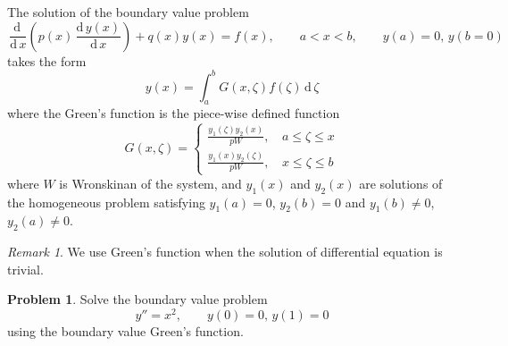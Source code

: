 \documentclass[12pt,a4paper]{article}
\theoremstyle{remark}
\newtheorem* {rem}{Remark}
\theoremstyle{definition}
\newtheorem{prob}{Problem}[section]
\newcommand{\ddx}[1]{\,\frac{\mathrm{d}\,#1}{\mathrm{d}\,x}}
\newcommand{\D}{\,\mathrm{d}\,}
\begin{document}
The solution of the boundary value problem
\[
    \ddx{}\left( p(x)\ddx{y(x)} \right)+q(x)y(x)=f(x),\qquad a<x<b,\qquad y(a)=0,\,y(b=0)
\]
takes the form
\[
    y(x)=\int_a^b G(x,\zeta)f(\zeta)\D \zeta
\]
where the Green's function is the piece-wise defined function
\[
    G(x,\zeta)=\begin{cases}
        \displaystyle \frac{y_1(\zeta)y_2(x)}{pW}, & \,a\leq \zeta\leq x \\
        \displaystyle \frac{y_1(x)y_2(\zeta)}{pW}, & \,x\leq \zeta\leq b
    \end{cases}
\]
where $ W $ is Wronskinan of the system, and $ y_1(x) $ and $ y_2(x) $ are solutions of the homogeneous problem satisfying $ y_1(a)=0 $, $ y_2(b)=0 $ and $ y_1(b)\neq 0 $, $ y_2(a)\neq 0 $.
\begin{rem}
    We use Green's function when the solution of differential equation is trivial.
\end{rem}
\begin{prob}
    Solve the boundary value problem
    \[
        y''=x^2,\qquad y(0)=0,\,y(1)=0
    \]
    using the boundary value Green's function.
\end{prob}
\end{document}
